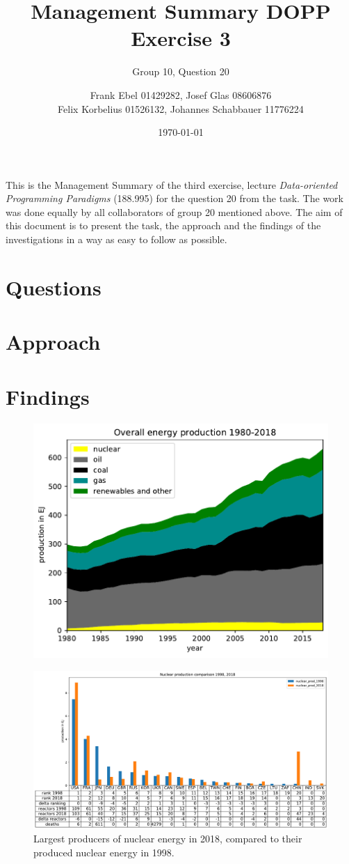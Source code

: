 \documentclass[a4paper,10pt,twocolumn]{scrartcl}
\author{Frank Ebel 01429282, Josef Glas 08606876\\Felix Korbelius 01526132, Johannes Schabbauer 11776224}
\title{\vspace*{-1cm}Management Summary DOPP Exercise 3}
\subtitle{Group 10, Question 20}
\date{\today \vspace*{-0.8cm}}
\begin{document}
\sffamily
\maketitle

This is the Management Summary of the third exercise, lecture \emph{Data-oriented Programming Paradigms} (188.995) for the question 20 from the task. The work was done equally by all collaborators of group 20 mentioned above. The aim of this document is to present the task, the approach and the findings of the investigations in a way as easy to follow as possible.

\section{Questions}

\section{Approach}

\section{Findings}

\begin{figure}[h]
	\centering
 	\includegraphics[width=\columnwidth]{../figures/q1_plot1.pdf}
 	\label{fig:q1_plot1}
\end{figure}

\begin{figure}[hbt]
	\centering
	\includegraphics[width=\textwidth]{../figures/q1_plot2.pdf}
	\caption{Largest producers of nuclear energy in 2018, compared to their produced nuclear energy in 1998.}
	\label{fig:q2_plot2}
\end{figure}

\end{document}
